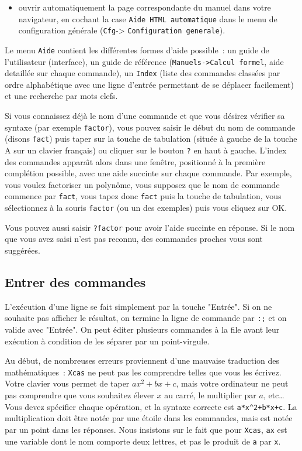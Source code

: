 \documentclass{article}
\begin{document}
\begin{giacjshere}
\begin{itemize}
\begin{itemize}
\item  ouvrir automatiquement la page correspondante du manuel dans votre 
navigateur, en cochant la case \verb|Aide HTML automatique| dans le menu de 
configuration  g\'en\'erale (\verb|Cfg|-> \verb|Configuration generale|).
\end{itemize}
\end{itemize}
Le menu \verb|Aide| contient les diff\'erentes formes d'aide possible~:
un guide de l'utilisateur (interface), un guide de r\'ef\'erence
(\verb|Manuels->Calcul formel|, aide detaill\'ee sur chaque commande), 
un \verb|Index| (liste des commandes class\'ees par ordre 
alphab\'etique avec une ligne d'entr\'ee permettant de se d\'eplacer
facilement) et une recherche par mots clefs.

Si vous connaissez d\'ej\`a le nom d'une commande et que vous d\'esirez
v\'erifier sa syntaxe (par exemple \verb|factor|), vous pouvez
saisir le d\'ebut du nom de commande 
(disons \verb|fact|) puis taper sur la touche de tabulation
(situ\'ee \`a gauche de la touche A sur un clavier
fran\c{c}ais) ou cliquer sur le bouton \verb|?| en haut \`a gauche. 
L'index des commandes appara\^\i t alors dans une fen\^etre, positionn\'e 
\`a la premi\`ere compl\'etion possible, avec une aide succinte sur chaque
commande. 
Par exemple, vous voulez factoriser un polyn\^ome, vous supposez que le nom de
commande commence par \verb|fact|, vous tapez donc \verb|fact| puis
la touche de tabulation, vous s\'electionnez \`a la souris
\verb|factor| (ou un des exemples) puis vous cliquez sur OK.

Vous pouvez aussi saisir \verb|?factor| pour avoir l'aide succinte
en r\'eponse. Si le nom que vous avez saisi n'est pas reconnu, des
commandes proches vous sont sugg\'er\'ees.

%
\subsection{Entrer des commandes}
%
L'ex\'ecution d'une ligne se fait simplement par la touche "Entr\'ee". 
Si on ne souhaite pas afficher le r\'esultat, on termine la ligne de commande
par \verb|:;| et on valide avec "Entr\'ee".
On peut \'editer plusieurs commandes \`a la file avant leur ex\'ecution
\`a condition de les s\'eparer par un point-virgule.

Au d\'ebut, de nombreuses erreurs proviennent d'une
mauvaise traduction des math\'ematiques~: {\tt Xcas} ne peut pas les comprendre
telles que vous les \'ecrivez. Votre clavier vous
permet de taper $ax^2+bx+c$, mais votre ordinateur ne peut pas
comprendre que vous souhaitez \'elever $x$ au carr\'e, le multiplier
par $a$, etc\ldots~ Vous devez sp\'ecifier chaque op\'eration, et la
syntaxe correcte est \verb|a*x^2+b*x+c|.  
La multiplication doit \^etre not\'ee par une \'etoile 
dans les commandes, mais est not\'ee par un point dans
les r\'eponses. Nous insistons sur le fait que pour {\tt Xcas}, \verb|ax| est 
une variable dont le nom comporte deux lettres, et pas le produit de \verb|a|
par \verb|x|.


\end{giacjshere}
\end{document}
